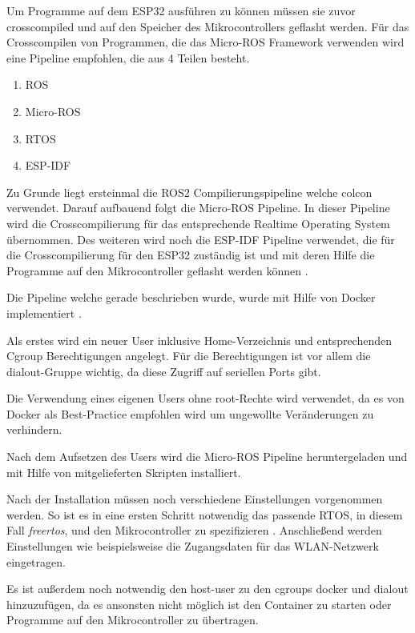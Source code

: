 \begin{flushleft}


    Um Programme auf dem ESP32 ausführen zu können müssen sie zuvor crosscompiled und auf den Speicher des Mikrocontrollers geflasht werden.
    Für das Crosscompilen von Programmen, die das Micro-ROS Framework verwenden wird eine Pipeline empfohlen, die aus 4 Teilen besteht.
    \begin{enumerate}
        \item ROS
        \item Micro-ROS
        \item RTOS
        \item ESP-IDF
    \end{enumerate}

    Zu Grunde liegt ersteinmal die ROS2 Compilierungspipeline welche colcon verwendet.
    Darauf aufbauend folgt die Micro-ROS Pipeline. In dieser Pipeline wird die Crosscompilierung für das entsprechende Realtime Operating System übernommen.
    Des weiteren wird noch die ESP-IDF Pipeline verwendet, die für die Crosscompilierung für den ESP32 zuständig ist und mit deren Hilfe die Programme auf den Mikrocontroller geflasht werden können \cite{esp_idf}.

    Die Pipeline welche gerade beschrieben wurde, wurde mit Hilfe von Docker implementiert \cite{docker_best_practices}.

    Als erstes wird ein neuer User inklusive Home-Verzeichnis und entsprechenden Cgroup Berechtigungen angelegt.
    Für die Berechtigungen ist vor allem die dialout-Gruppe wichtig, da diese Zugriff auf seriellen Ports gibt.

    Die Verwendung eines eigenen Users ohne root-Rechte wird verwendet, 
    da es von Docker als Best-Practice empfohlen wird um ungewollte Veränderungen zu verhindern.


    Nach dem Aufsetzen des Users wird die Micro-ROS Pipeline heruntergeladen und mit Hilfe von mitgelieferten Skripten installiert.

    Nach der Installation müssen noch verschiedene Einstellungen vorgenommen werden. So ist es in eine ersten Schritt notwendig das passende RTOS, in diesem Fall \textit{freertos},
    und den Mikrocontroller zu spezifizieren \cite{freertos}. Anschließend werden Einstellungen wie beispielsweise die Zugangsdaten für das WLAN-Netzwerk eingetragen.

    Es ist außerdem noch notwendig den host-user zu den cgroups docker und dialout hinzuzufügen, 
    da es ansonsten nicht möglich ist den Container zu starten oder Programme auf den Mikrocontroller zu übertragen.



\end{flushleft}
